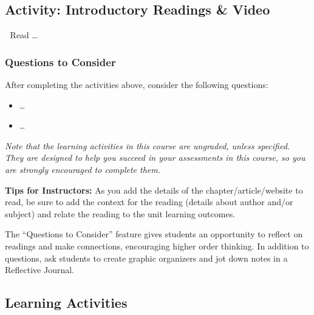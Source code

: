 \documentclass[
]{book}
\providecommand{\tightlist}{%
  \setlength{\itemsep}{0pt}\setlength{\parskip}{0pt}}
\begin{document}
\hypertarget{activity-introductory-readings-video}{%
\subsection*{Activity: Introductory Readings \& Video}\label{activity-introductory-readings-video}}

\begin{reflect}
📗 Read \ldots{}

\hypertarget{questions-to-consider}{%
\subsubsection*{Questions to Consider}\label{questions-to-consider}}

After completing the activities above, consider the following questions:

\begin{itemize}
\tightlist
\item
  \ldots{}\\
\item
  \ldots{}
\end{itemize}
\end{reflect}

\emph{Note that the learning activities in this course are ungraded, unless specified. They are designed to help you succeed in your assessments in this course, so you are strongly encouraged to complete them.}

\begin{feedback}
\textbf{Tips for Instructors:}
As you add the details of the chapter/article/website to read, be sure to add the context for the reading (details about author and/or subject) and relate the reading to the unit learning outcomes.

The ``Questions to Consider'' feature gives students an opportunity to reflect on readings and make connections, encouraging higher order thinking. In addition to questions, ask students to create graphic organizers and jot down notes in a Reflective Journal.
\end{feedback}

\hypertarget{learning-activities-4}{%
\subsection*{Learning Activities}\label{learning-activities-4}}
\end{document}
